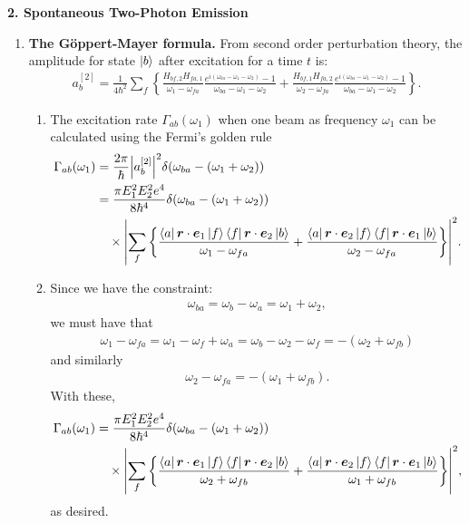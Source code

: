 \documentclass{article}
\theoremstyle{definition}
\newcommand{\f}[2]{\frac{#1}{#2}}
\newcommand{\lc}{\left\{}
\newcommand{\rc}{\right\}}
\begin{document}
\newpage

\noindent \textbf{2. Spontaneous Two-Photon Emission}


\begin{enumerate}
	\item \textbf{The G\"{o}ppert-Mayer formula.} From second order perturbation theory, the amplitude for state $\ket{b}$ after excitation for a time $t$ is: 
	\begin{align*}
	a^{[2]}_b = \f{1}{4\hbar^2}\sum_f \lc \f{H_{bf,2}H_{fa,1}}{\omega_1 - \omega_{fa}}\f{e^{i(\omega_{ba} - \omega_1 - \omega_2)} - 1}{\omega_{ba} - \omega_1 - \omega_2} 
	+
	\f{H_{bf,1}H_{fa,2}}{\omega_2 - \omega_{fa}}\f{e^{i(\omega_{ba} - \omega_1 - \omega_2)} - 1}{\omega_{ba} - \omega_1 - \omega_2}
	\rc.
	\end{align*}
	
	
	\begin{enumerate}[label=(\roman*)]
		\item The excitation rate $\Gamma_{ab}(\omega_1)$ when one beam as frequency $\omega_1$ can be calculated using  the Fermi's golden rule
		\begin{align*}
		\Gamma_{ab}(\omega_1) 
		&= \f{2\pi}{\hbar}\abs{a_b^{[2]}}^2 \delta(\omega_{ba} - (\omega_1 + \omega_2)) \\
		&= \f{\pi E_1^2 E_2^2 e^4}{8\hbar^4}\delta(\omega_{ba} - (\omega_1 + \omega_2)) \\
		&\quad \times \abs{ \sum_f 
			\lc 
			\f{\bra{a} \bm{r}\cdot \bm{e}_1\ket{f}\bra{f} \bm{r}\cdot {\bm{e}}_2 \ket{b}}{\omega_1 - \omega_{fa}} + 
			\f{\bra{a} \bm{r}\cdot \bm{e}_2\ket{f}\bra{f} \bm{r}\cdot {\bm{e}}_1 \ket{b}}{\omega_2 - \omega_{fa}}
			\rc }^2.
		\end{align*}
		
		\item Since we have the constraint:
		\begin{align*}
		\omega_{ba} = \omega_b - \omega_a = \omega_1 + \omega_2, 
		\end{align*}
		we must have that
		\begin{align*}
		\omega_1 - \omega_{fa} = \omega_1 - \omega_f + \omega_a = \omega_{b} - \omega_2 - \omega_f = -(\omega_2 + \omega_{fb})
		\end{align*}
		and similarly
		\begin{align*}
		\omega_2 - \omega_{fa} = -(\omega_{1} + \omega_{fb}).
		\end{align*}
		With these, 
		\begin{align*}
		\Gamma_{ab}(\omega_1) 
		&= \f{\pi E_1^2 E_2^2 e^4}{8\hbar^4}\delta(\omega_{ba} - (\omega_1 + \omega_2)) \\
		&\quad \times \abs{ \sum_f 
			\lc 
			\f{\bra{a} \bm{r}\cdot \bm{e}_1\ket{f}\bra{f} \bm{r}\cdot {\bm{e}}_2 \ket{b}}{\omega_2 + \omega_{fb}} + 
			\f{\bra{a} \bm{r}\cdot \bm{e}_2\ket{f}\bra{f} \bm{r}\cdot {\bm{e}}_1 \ket{b}}{\omega_{1} + \omega_{fb}}
			\rc }^2,
		\end{align*}
		as desired. 
		

\end{enumerate}
\end{enumerate}
\end{document}
